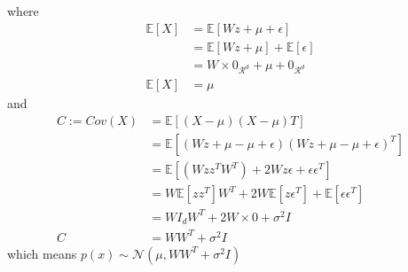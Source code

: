\documentclass{article}
\begin{document}
where
\begin{align*}
    \mathbb{E}[X] &= \mathbb{E}[Wz+\mu+\epsilon] \\
    &= \mathbb{E}[Wz+\mu] + \mathbb{E}[\epsilon] \\
    &= W \times 0_{\mathcal{R}^d} + \mu + 0_{\mathcal{R}^d} \\
    \mathbb{E}[X] &= \mu
\end{align*}
and 
\begin{align*}
    C := Cov(X) &= \mathbb{E}[(X-\mu) (X-\mu)T] \\
    &= \mathbb{E}[(Wz + \mu -\mu + \epsilon) (Wz + \mu -\mu + \epsilon)^T] \\
    &= \mathbb{E}[(Wzz^TW^T) + 2Wz\epsilon + \epsilon\epsilon^T] \\
    &= W\mathbb{E}[zz^T]W^T + 2W\mathbb{E}[z\epsilon^T] + \mathbb{E}[\epsilon\epsilon^T] \\
    &= WI_{d}W^T + 2W \times 0 + \sigma^2 I \\
    C &= WW^T + \sigma^2I
\end{align*}
which means $p(x) \sim \mathcal{N}(\mu,WW^T+\sigma^2I)$
\end{document}
